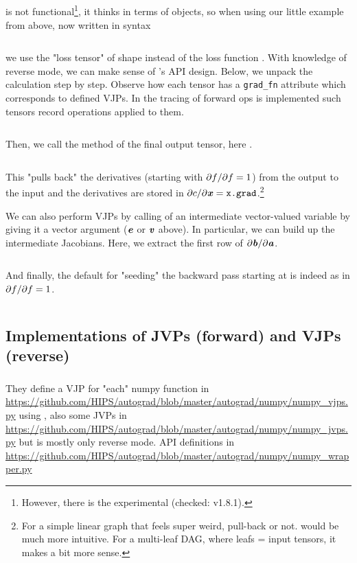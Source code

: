 \documentclass[11pt]{scrartcl}
\newcommand{\ipmpy}[1]{\inputminted[xleftmargin=0.9cm]{python}{#1}}
\begin{document}
\subsection{\pytorch}
%
\pytorch is not functional\footnote{However, there is the experimental
 (checked: v1.8.1).}, it thinks in terms of
 objects, so when using our little example from above, now
written in \pytorch syntax
%
\ipmpy{../talk/code/pytorch_fwd_rev_1.py}
%
we use the "loss tensor"  of shape  instead of the loss function
. With knowledge of reverse mode, we can make sense of \pytorch's API
design. Below, we unpack the calculation step by step. Observe how each tensor
has a \verb|grad_fn| attribute which corresponds to defined VJPs. In \pytorch
the tracing of forward ops is implemented such tensors record
operations applied to them.
%
\ipmpy{../talk/code/pytorch_fwd_rev_2.py}
%
Then, we call the  method of the final output tensor, here
.
%
\ipmpy{../talk/code/pytorch_fwd_rev_3.py}
%
This "pulls back" the derivatives (starting with $\partial f/\partial f=1$) from the
output  to the input and the derivatives are stored in $\partial c/\partial \bm{\mathit{x}} =
\texttt{x.grad}$.\footnote{For a simple linear graph that feels super weird,
pull-back or not.  would be much more intuitive. For a multi-leaf
DAG, where leafs = input tensors, it makes a bit more sense.}

We can also perform VJPs by calling  of an intermediate
vector-valued variable by giving it a vector argument ($\bm{\mathit{e}}$ or $\bm{\mathit{v}}$ above). In particular, we can build up the intermediate
Jacobians. Here, we extract the first row of $\partial \bm{\mathit{b}}/\partial \bm{\mathit{a}}$.
%
\ipmpy{../talk/code/pytorch_rev_detail_2.py}
%
And finally, the default for "seeding" the backward pass starting at 
is indeed  as in $\partial f/\partial f=1$.
%
\ipmpy{../talk/code/pytorch_rev_detail_1.py}

\subsection{Implementations of JVPs (forward) and VJPs (reverse)}

\subsubsection{\autograd}

They define a VJP for "each" numpy function in
\url{https://github.com/HIPS/autograd/blob/master/autograd/numpy/numpy_vjps.py}
using , also some JVPs in
\url{https://github.com/HIPS/autograd/blob/master/autograd/numpy/numpy_jvps.py}
but \autograd is mostly only reverse mode. \numpy API definitions in
\url{https://github.com/HIPS/autograd/blob/master/autograd/numpy/numpy_wrapper.py}
\end{document}

